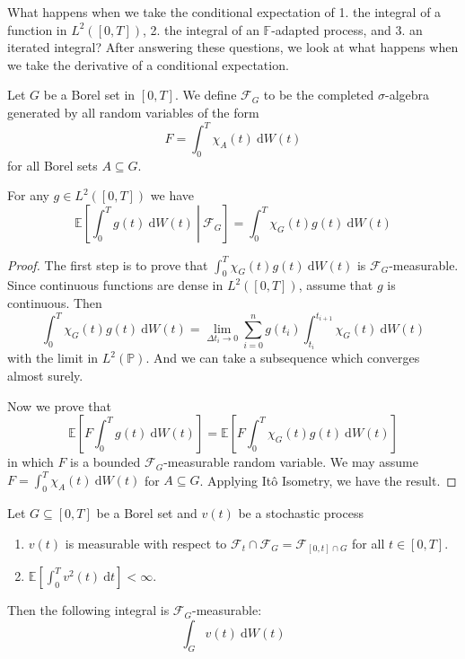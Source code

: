 What happens when we take the conditional expectation of 1. the integral of a function in $L^2([0, T])$, 2. the integral of an $\mathbb{F}$-adapted process, and 3. an iterated integral? After answering these questions, we look at what happens when we take the derivative of a conditional expectation. 

\begin{definition}
Let $G$ be a Borel set in $[0,T]$. We define $\mathcal{F}_G$ to be the completed $\sigma$-algebra generated by all random variables of the form 
$$
F = \int_0^T \chi_A(t) ~\mathrm{d}W(t)
$$
for all Borel sets $A \subseteq G$.
\end{definition}

\begin{lemma}\label{lm:202310311340} 
	For any $g \in L^2([0,T])$ we have 
	$$
	\mathbb{E} \left[ \left.\int_0^T g(t) ~\mathrm{d} W(t) ~\right| ~\mathcal{F}_G \right] = \int_0^ T \chi_G(t) g(t) ~\mathrm{d} W(t)
	$$
\end{lemma}

\begin{proof}
	The first step is to prove that $\int_0^T \chi_G(t) g(t) ~\mathrm{d}W(t)$ is $\mathcal{F}_G$-measurable. Since continuous functions are dense in $L^2([0,T])$, assume that $g$ is continuous. Then 
	$$
	\int_0^T \chi_G(t) g(t) ~\mathrm{d}W(t) = \lim_{\Delta t_i \to 0} \sum_{i=0}^n g(t_i) \int_{t_i}^{t_{i+1}} \chi_G(t) ~\mathrm{d}W(t)
	$$
	with the limit in $L^2(\mathbb{P})$. And we can take a subsequence which converges almost surely.

	Now we prove that 
	$$
	\mathbb{E} \left[ F \int_0^T g(t) ~\mathrm{d}W(t) \right] = \mathbb{E} \left[ F \int_0^T \chi_G(t) g(t) ~\mathrm{d}W(t) \right] 
	$$
	in which $F$ is a bounded $\mathcal{F}_G$-measurable random variable. We may assume $F = \int_0^T \chi_A(t) ~\mathrm{d}W(t)$ for $A \subseteq G$. Applying Itô Isometry, we have the result.
\end{proof}

\begin{lemma}\label{lm:202310311343}
	Let $G \subseteq [0,T]$ be a Borel set and $v(t)$ be a stochastic process  
	\begin{enumerate}
	\item $v(t)$ is measurable with respect to $\mathcal{F}_t \cap \mathcal{F}_G = \mathcal{F}_{[0,t] \cap G}$ for all $t \in [0,T]$.
	\item $\mathbb{E} \left[ \int_0^T v^2(t) ~\mathrm{d}t \right] < \infty$.
	\end{enumerate}

	Then the following integral is $\mathcal{F}_G$-measurable:
	$$
	\int_G v(t) ~\mathrm{d}W(t)
	$$
\end{lemma}


